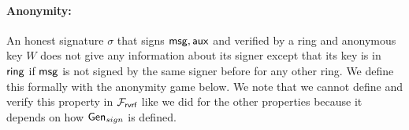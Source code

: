 	
	
	
	
	
	\paragraph{Anonymity:} An honest signature $ \sigma $ that signs $ \mathsf{msg}, \mathsf{aux} $ and verified by a ring and anonymous key $ W $ does not give any information about its signer except that its key is in $ \mathsf{ring} $ if $ \mathsf{msg} $ is not signed by the same signer before for any other ring. We define this formally with the anonymity game below. We note that we cannot define and verify this property in $ \mathcal{F}_{\textsf{rvrf}} $ like we did for the other properties because it depends on how $ \mathsf{Gen}_{sign} $ is defined.
	
